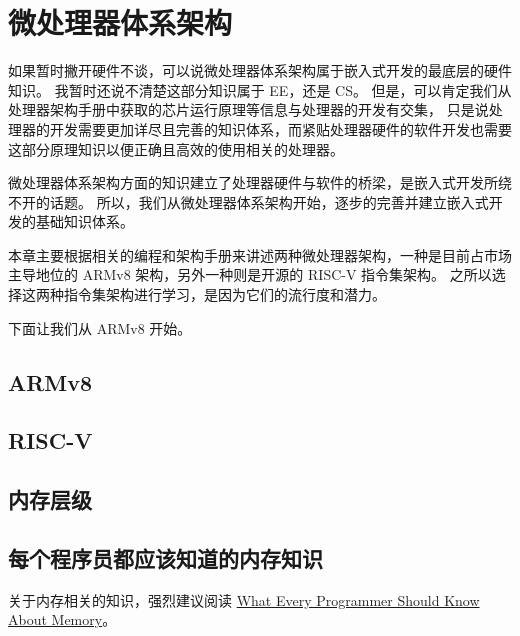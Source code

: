 \chapter{微处理器体系架构}

如果暂时撇开硬件不谈，可以说微处理器体系架构属于嵌入式开发的最底层的硬件知识。
我暂时还说不清楚这部分知识属于 EE，还是 CS。
但是，可以肯定我们从处理器架构手册中获取的芯片运行原理等信息与处理器的开发有交集，
只是说处理器的开发需要更加详尽且完善的知识体系，而紧贴处理器硬件的软件开发也需要这部分原理知识以便正确且高效的使用相关的处理器。

微处理器体系架构方面的知识建立了处理器硬件与软件的桥梁，是嵌入式开发所绕不开的话题。
所以，我们从微处理器体系架构开始，逐步的完善并建立嵌入式开发的基础知识体系。

本章主要根据相关的编程和架构手册来讲述两种微处理器架构，一种是目前占市场主导地位的 ARMv8 架构，另外一种则是开源的 RISC-V 指令集架构。
之所以选择这两种指令集架构进行学习，是因为它们的流行度和潜力。

下面让我们从 ARMv8 开始。

\section{ARMv8}


\section{RISC-V}


\section{内存层级}

\section{每个程序员都应该知道的内存知识}

关于内存相关的知识，强烈建议阅读
\href{https://people.freebsd.org/~lstewart/articles/cpumemory.pdf}{What Every Programmer Should Know About Memory}。


